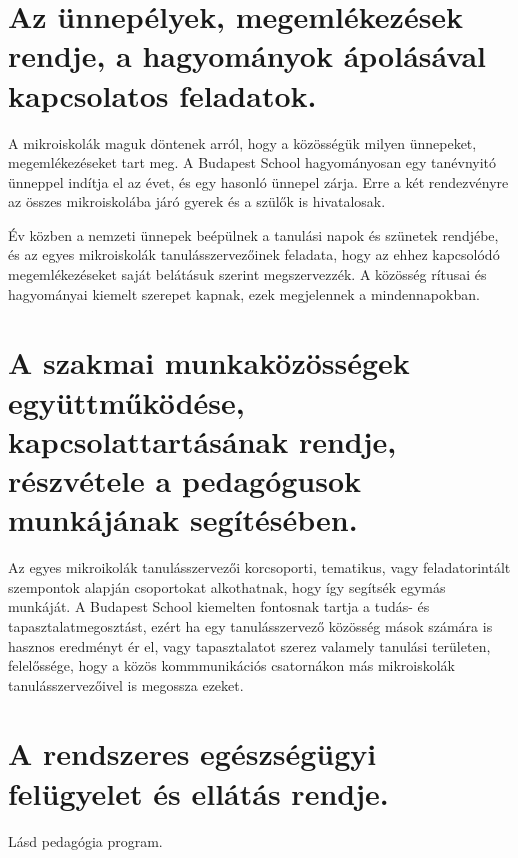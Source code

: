 \section{Az ünnepélyek, megemlékezések rendje, a hagyományok ápolásával kapcsolatos feladatok.}
A mikroiskolák maguk döntenek arról, hogy a közösségük milyen ünnepeket, megemlékezéseket tart meg. A  Budapest School hagyományosan egy tanévnyitó ünneppel indítja el az évet, és egy hasonló ünnepel zárja. Erre a két rendezvényre az összes mikroiskolába járó gyerek és a szülők is hivatalosak. 

Év közben a nemzeti ünnepek beépülnek a tanulási napok és szünetek rendjébe, és az egyes mikroiskolák tanulásszervezőinek feladata, hogy az ehhez kapcsolódó megemlékezéseket saját belátásuk szerint megszervezzék. A közösség rítusai és hagyományai kiemelt szerepet kapnak, ezek megjelennek a mindennapokban.  

\section{A szakmai munkaközösségek együttműködése, kapcsolattartásának rendje, részvétele a pedagógusok munkájának segítésében.}
Az egyes mikroikolák tanulásszervezői korcsoporti, tematikus, vagy feladatorintált szempontok alapján csoportokat alkothatnak, hogy így segítsék egymás munkáját. A Budapest School kiemelten fontosnak tartja a tudás- és tapasztalatmegosztást, ezért ha egy tanulásszervező közösség mások számára is hasznos eredményt ér el, vagy tapasztalatot szerez valamely tanulási területen, felelőssége, hogy a közös kommmunikációs csatornákon más mikroiskolák tanulásszervezőivel is megossza ezeket. 


\section{A rendszeres egészségügyi felügyelet és ellátás rendje.}
Lásd pedagógia program.

